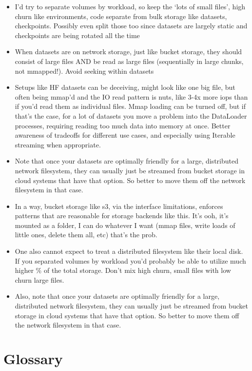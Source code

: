 \documentclass[
]{report}
\begin{document}
\begin{itemize}
\item
  I'd try to separate volumes by workload, so keep the `lots of small
  files', high churn like environments, code separate from bulk storage
  like datasets, checkpoints. Possibly even split those too since
  datasets are largely static and checkpoints are being rotated all the
  time
\item
  When datasets are on network storage, just like bucket storage, they
  should consist of large files AND be read as large files (sequentially
  in large chunks, not mmapped!). Avoid seeking within datasets
\item
  Setups like HF datasets can be deceiving, might look like one big
  file, but often being mmap'd and the IO read pattern is nuts, like
  3-4x more iops than if you'd read them as individual files. Mmap
  loading can be turned off, but if that's the case, for a lot of
  datasets you move a problem into the DataLoader processes, requiring
  reading too much data into memory at once. Better awareness of
  tradeoffs for different use cases, and especially using Iterable
  streaming when appropriate.
\item
  Note that once your datasets are optimally friendly for a large,
  distributed network filesystem, they can usually just be streamed from
  bucket storage in cloud systems that have that option. So better to
  move them off the network filesystem in that case.
\item
  In a way, bucket storage like s3, via the interface limitations,
  enforces patterns that are reasonable for storage backends like this.
  It's ooh, it's mounted as a folder, I can do whatever I want (mmap
  files, write loads of little ones, delete them all, etc) that's the
  prob.
\item
  One also cannot expect to treat a distributed filesystem like their
  local disk. If you separated volumes by workload you'd probably be
  able to utilize much higher \% of the total storage. Don't mix high
  churn, small files with low churn large files.
\item
  Also, note that once your datasets are optimally friendly for a large,
  distributed network filesystem, they can usually just be streamed from
  bucket storage in cloud systems that have that option. So better to
  move them off the network filesystem in that case.
\end{itemize}

\section{Glossary}\label{glossary}
\end{document}

